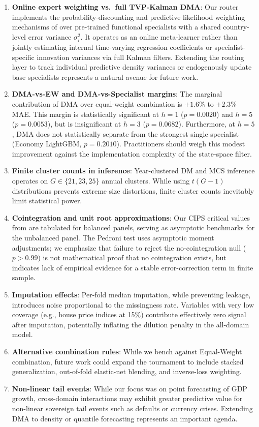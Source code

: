 \documentclass[11pt,a4paper]{article}
\begin{document}
\begin{enumerate}[leftmargin=*, label=\arabic*.]
    \item \textbf{Online expert weighting vs.\ full TVP-Kalman DMA}: Our router implements the probability-discounting and predictive likelihood weighting mechanisms of \citet{koop2012} over pre-trained functional specialists with a shared country-level error variance $\sigma_i^2$. It operates as an online meta-learner rather than jointly estimating internal time-varying regression coefficients or specialist-specific innovation variances via full Kalman filters. Extending the routing layer to track individual predictive density variances or endogenously update base specialists represents a natural avenue for future work.
    \item \textbf{DMA-vs-EW and DMA-vs-Specialist margins}: The marginal contribution of DMA over equal-weight combination is $+1.6\%$ to $+2.3\%$ MAE. This margin is statistically significant at $h=1$ ($p = 0.0020$) and $h=5$ ($p = 0.0053$), but is insignificant at $h=3$ ($p = 0.0682$). Furthermore, at $h=5$, DMA does not statistically separate from the strongest single specialist (Economy LightGBM, $p = 0.2010$). Practitioners should weigh this modest improvement against the implementation complexity of the state-space filter.
    \item \textbf{Finite cluster counts in inference}: Year-clustered DM and MCS inference operates on $G \in \{21, 23, 25\}$ annual clusters. While using $t(G-1)$ distributions prevents extreme size distortions, finite cluster counts inevitably limit statistical power.
    \item \textbf{Cointegration and unit root approximations}: Our CIPS critical values from \citet{pesaran2007} are tabulated for balanced panels, serving as asymptotic benchmarks for the unbalanced panel. The Pedroni test uses asymptotic moment adjustments; we emphasize that failure to reject the no-cointegration null ($p > 0.99$) is not mathematical proof that no cointegration exists, but indicates lack of empirical evidence for a stable error-correction term in finite sample.
    \item \textbf{Imputation effects}: Per-fold median imputation, while preventing leakage, introduces noise proportional to the missingness rate. Variables with very low coverage (e.g., house price indices at 15\%) contribute effectively zero signal after imputation, potentially inflating the dilution penalty in the all-domain model.
    \item \textbf{Alternative combination rules}: While we bench against Equal-Weight combination, future work could expand the tournament to include stacked generalization, out-of-fold elastic-net blending, and inverse-loss weighting.
    \item \textbf{Non-linear tail events}: While our focus was on point forecasting of GDP growth, cross-domain interactions may exhibit greater predictive value for non-linear sovereign tail events such as defaults or currency crises. Extending DMA to density or quantile forecasting represents an important agenda.
\end{enumerate}
\end{document}
